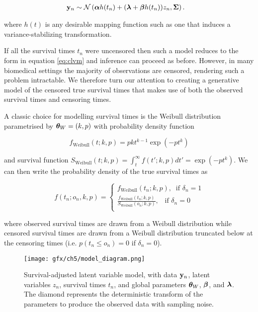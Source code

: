 \begin{equation}
  \begin{aligned}
\mathbf{y}_n & \sim \mathcal{N}\left( \bm{\alpha} h(t_n) + (\bm{\lambda} + \bm{\beta} h(t_n)) z_n, \bm{\Sigma} \right).
  \end{aligned}
\end{equation}

where $h(t)$ is any desirable mapping function such as one that induces a variance-stabilizing transformation.

If all the survival times $t_n$ were uncensored then such a model reduces to the form in equation \ref{eq:clvm} and inference can proceed as before. However, in many biomedical settings the majority of observations are censored, rendering such a problem intractable. We therefore turn our attention to creating a generative model of the censored true survival times that makes use of both the observed survival times and censoring times. %

A classic choice for modelling survival times is the Weibull distribution parametrised by $\bm{\theta}_W = (k,p)$ with probability density function

\begin{equation}
  f_{\text{Weibull}}(t; k,p) = pkt^{k-1} \exp(-pt^k)
\end{equation}

and survival function $S_{\text{Weibull}}(t; k, p) = \int_t^\infty f(t'; k, p) dt' = \exp(-pt^k)$. We can then write the probability density of the true survival times as

\begin{equation}
  f(t_n; o_n, k, p) =
  \begin{cases}
    f_{\text{Weibull}}(t_n; k, p), \; \; \text{if $\delta_n = 1$} \\
    \frac{f_{\text{Weibull}}(t_n; k, p)}{S_{\text{Weibull}}(o_n; k, p)}, \; \; \; \text{if $\delta_n = 0$} \\
  \end{cases}
\end{equation}

where observed survival times are drawn from a Weibull distribution while censored survival times are drawn from a Weibull distribution truncated below at the censoring times (i.e. $p(t_n \leq o_n) = 0$ if $\delta_n = 0$).

\begin{figure}
  \centering
\texttt{[image: gfx/ch5/model\_diagram.png]}
\caption{Survival-adjusted latent variable model, with data $\mathbf{y}_n$, latent variables $z_n$, survival times $t_n$, and global parameters $\bm{\theta}_W$, $\bm{\beta}$, and $\bm{\lambda}$. The diamond represents the deterministic transform of the parameters to produce the observed data with sampling noise.} \label{fig:model}
\end{figure}

